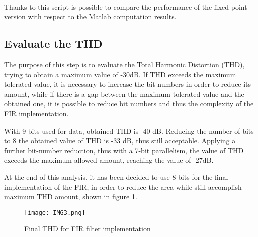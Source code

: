 \paragraph{}
Thanks to this script is possible to compare the performance of the fixed-point version with respect to 
the Matlab computation results.

\subsection{Evaluate the THD}

The purpose of this step is to evaluate the Total Harmonic Distortion (THD), trying to obtain a maximum 
value of -30dB. 
If THD exceeds the maximum tolerated value, it is necessary to increase 
the bit numbers in order to reduce its amount, while if there is a gap between the maximum tolerated value 
and the obtained one, it is possible to reduce bit numbers and thus the complexity of the FIR implementation.


With 9 bits used for data, obtained THD is -40 dB. 
Reducing the number of bits to 8 the obtained value of THD  
is -33 dB, thus still acceptable. 
Applying a further bit-number reduction, thus with a 7-bit parallelism, the value of THD exceeds the maximum allowed
amount, reaching the value of -27dB.

At the end of this analysis, it has been decided to use 8 bits for the final implementation of the  FIR, 
in order to reduce the area while still accomplish maximum THD amount, shown in figure \ref{fig:3}.
\begin{figure}[!h]
	\caption{Final THD for FIR filter implementation}
	\label{fig:3}
	\texttt{[image: IMG3.png]}
	\centering
\end{figure}

